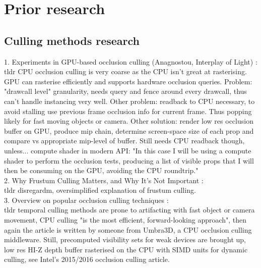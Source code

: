
\chapter{Prior research}\label{chapter:introduction}

\section{Culling methods research}
1. Experiments in GPU-based occlusion culling (Anagnostou, Interplay of Light) \cite{Anagnostou.2017}: \\
tldr CPU occlusion culling is very coarse as the CPU isn't great at rasterising. GPU can rasterise efficiently and supports hardware occlusion queries. Problem: "drawcall level" granularity, needs query and fence around every drawcall, thus can't handle instancing very well. Other problem: readback to CPU necessary, to avoid stalling use previous frame occlusion info for current frame. Thus popping likely for fast moving objects or camera. 
Other solution: render low res occlusion buffer on GPU, produce mip chain, determine screen-space size of each prop and compare vs appropriate mip-level of buffer. Still needs CPU readback though, unless... compute shader in modern API: "In this case I will be using a compute shader to perform the occlusion tests, producing a list of visible props that I will then be consuming on the GPU, avoiding the CPU roundtrip."\\

2. Why Frustum Culling Matters, and Why It's Not Important \cite{Barrett.2017}: \\
tldr disregardm, oversimplified explanation of frustum culling.\\

3. Overview on popular occlusion culling techniques \cite{gamesindustry.biz.2016}: \\
tldr temporal culling methods are prone to artifacting with fast object or camera movement, CPU culling "is the most efficient, forward-looking approach", then again the article is written by someone from Umbra3D, a CPU occlusion culling middleware. 
Still, precomputed visibility sets for weak devices are brought up, low res HI-Z depth buffer rasterised on the CPU with SIMD units for dynamic culling, see Intel's 2015/2016 occlusion culling article.\\

